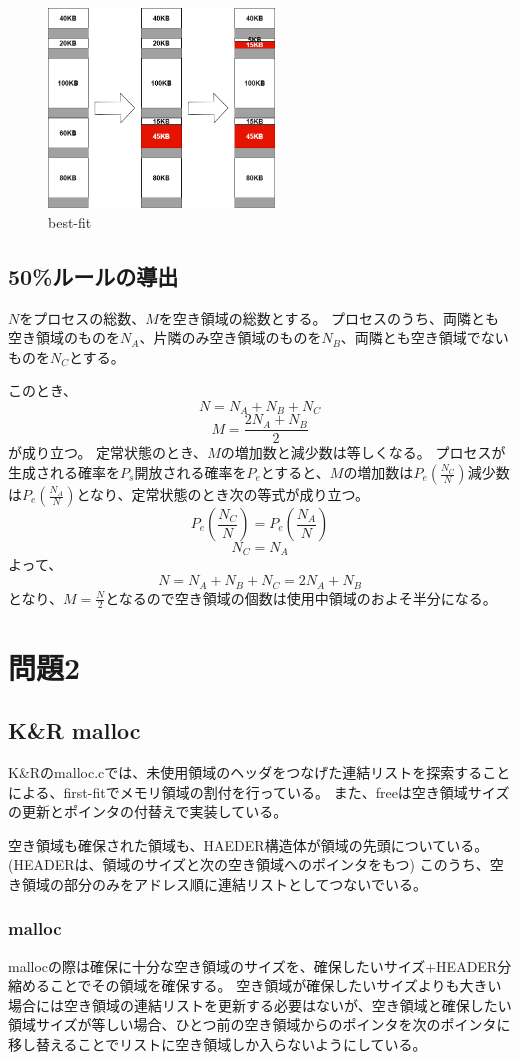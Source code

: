 \documentclass[a4paper,10pt]{jsarticle}
\begin{document}
\begin{figure}[H]
  \centering
  \includegraphics[width=6cm]{./03.drawio.png}
  \caption{best-fit}
  \label{best-fit}
\end{figure}

\newpage
\subsection{50\%ルールの導出}
$N$をプロセスの総数、$M$を空き領域の総数とする。
プロセスのうち、両隣とも空き領域のものを$N_A$、片隣のみ空き領域のものを$N_B$、両隣とも空き領域でないものを$N_C$とする。

このとき、\[N=N_A+N_B+N_C\] \[M=\frac{2N_A+N_B}{2}\]が成り立つ。
定常状態のとき、$M$の増加数と減少数は等しくなる。
プロセスが生成される確率を$P_s$開放される確率を$P_e$とすると、$M$の増加数は$P_e\left(\frac{N_C}{N}\right)$減少数は\(P_e\left(\frac{N_A}{N}\right)\)となり、定常状態のとき次の等式が成り立つ。
\[P_e\left(\frac{N_C}{N}\right)=P_e\left(\frac{N_A}{N}\right)\]
\[N_C=N_A\]
よって、
\[N=N_A+N_B+N_C=2N_A+N_B\]となり、\(M=\frac{N}{2}\)となるので空き領域の個数は使用中領域のおよそ半分になる。

\section{問題2}
\subsection{K\&R malloc}
K\&Rのmalloc.cでは、未使用領域のヘッダをつなげた連結リストを探索することによる、first-fitでメモリ領域の割付を行っている。
また、freeは空き領域サイズの更新とポインタの付替えで実装している。

空き領域も確保された領域も、HAEDER構造体が領域の先頭についている。
(HEADERは、領域のサイズと次の空き領域へのポインタをもつ)
このうち、空き領域の部分のみをアドレス順に連結リストとしてつないでいる。
\subsubsection{malloc}
mallocの際は確保に十分な空き領域のサイズを、確保したいサイズ+HEADER分縮めることでその領域を確保する。
空き領域が確保したいサイズよりも大きい場合には空き領域の連結リストを更新する必要はないが、空き領域と確保したい領域サイズが等しい場合、ひとつ前の空き領域からのポインタを次のポインタに移し替えることでリストに空き領域しか入らないようにしている。
\end{document}
